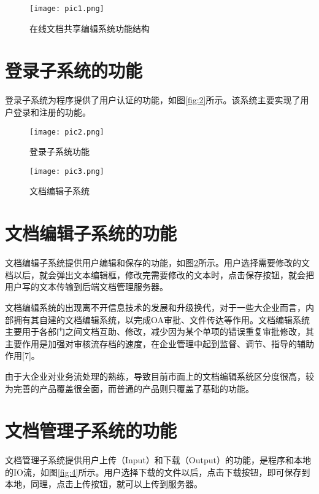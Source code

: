 \documentclass[forprint]{software}
\begin{document}
\begin{figure}[!htbp]
	\centering
	\texttt{[image: pic1.png]}
	\caption{在线文档共享编辑系统功能结构}
	\label{fig:1}
\end{figure}

\section{登录子系统的功能}

登录子系统为程序提供了用户认证的功能，如图\ref{fig:2}所示。该系统主要实现了用户登录和注册的功能。

\begin{figure}[ht]
	\centering
	\begin{minipage}[t]{0.45\linewidth}
		\centering
		\texttt{[image: pic2.png]}
		\caption{登录子系统功能}
		\label{fig:2}
	\end{minipage}%
	\begin{minipage}[t]{0.45\linewidth}
		\centering
		\texttt{[image: pic3.png]}
		\caption{文档编辑子系统}
		\label{fig:3}
	\end{minipage}%
\end{figure}

\section{文档编辑子系统的功能}

文档编辑子系统提供用户编辑和保存的功能，如图\ref{fig:3}所示。用户选择需要修改的文档以后，就会弹出文本编辑框，修改完需要修改的文本时，点击保存按钮，就会把用户写的文本传输到后端文档管理服务器。

文档编辑系统的出现离不开信息技术的发展和升级换代，对于一些大企业而言，内部拥有其自建的文档编辑系统，以完成OA审批、文件传达等作用。文档编辑系统主要用于各部门之间文档互助、修改，减少因为某个单项的错误重复审批修改，其主要作用是加强对审核流存档的速度，在企业管理中起到监督、调节、指导的辅助作用[7]。

由于大企业对业务流处理的熟练，导致目前市面上的文档编辑系统区分度很高，较为完善的产品覆盖很全面，而普通的产品则只覆盖了基础的功能。

\section{文档管理子系统的功能}

文档管理子系统提供用户上传（Input）和下载（Output）的功能，是程序和本地的IO流，如图\ref{fig:4}所示。用户选择下载的文件以后，点击下载按钮，即可保存到本地，同理，点击上传按钮，就可以上传到服务器。
\end{document}
